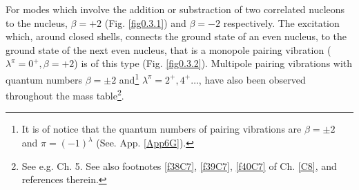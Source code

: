 For modes which involve the addition or substraction of two correlated nucleons to the nucleus, $\beta=+2$ (Fig. \ref{fig0.3.1}) and $\beta=-2$ respectively. The excitation which, around closed shells, connects the ground state of an even nucleus, to the ground state of the next even nucleus, that is a monopole pairing vibration  ($\lambda^\pi=0^+, \beta=+2$) is of this type (Fig. \ref{fig0.3.2}). Multipole pairing vibrations with quantum numbers $\beta=\pm 2$ and\footnote{It is of notice that the quantum numbers of pairing vibrations are $\beta=\pm2$ and $\pi=(-1)^\lambda$ (See. App. \ref{App6G}).} $\lambda^\pi=2^+,4^+\dots$, have also been observed throughout the mass table\footnote{\label{f8Ch1} See e.g. \cite{Flynn:71,Flynn:72,Brink:05} Ch. 5. See also footnotes \ref{f38C7}, \ref{f39C7}, \ref{f40C7} of Ch. \ref{C8}, and references therein.}.





